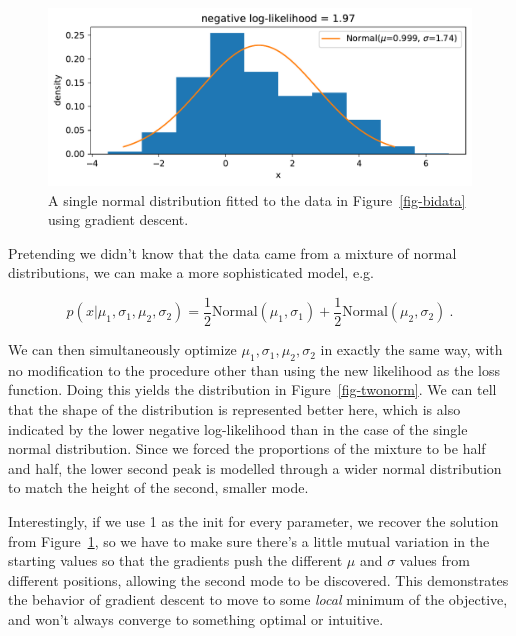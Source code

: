 \documentclass[
  11pt,
  numbers=noendperiod]{book}
\begin{document}
\begin{figure}

{\centering \includegraphics{./diffprog_files/figure-pdf/fig-onenorm-output-1.pdf}

}

\caption{\label{fig-onenorm}A single normal distribution fitted to the
data in Figure~\ref{fig-bidata} using gradient descent.}

\end{figure}

Pretending we didn't know that the data came from a mixture of normal
distributions, we can make a more sophisticated model, e.g.

\[
p(x |\mu_1, \sigma_1, \mu_2, \sigma_2) = \frac{1}{2}\mathrm{Normal}(\mu_1, \sigma_1) + \frac{1}{2}\mathrm{Normal}(\mu_2, \sigma_2)~.
\]

We can then simultaneously optimize \(\mu_1, \sigma_1, \mu_2, \sigma_2\)
in exactly the same way, with no modification to the procedure other
than using the new likelihood as the loss function. Doing this yields
the distribution in Figure~\ref{fig-twonorm}. We can tell that the shape
of the distribution is represented better here, which is also indicated
by the lower negative log-likelihood than in the case of the single
normal distribution. Since we forced the proportions of the mixture to
be half and half, the lower second peak is modelled through a wider
normal distribution to match the height of the second, smaller mode.

Interestingly, if we use 1 as the init for every parameter, we recover
the solution from Figure~\ref{fig-onenorm}, so we have to make sure
there's a little mutual variation in the starting values so that the
gradients push the different \(\mu\) and \(\sigma\) values from
different positions, allowing the second mode to be discovered. This
demonstrates the behavior of gradient descent to move to some
\emph{local} minimum of the objective, and won't always converge to
something optimal or intuitive.
\end{document}
